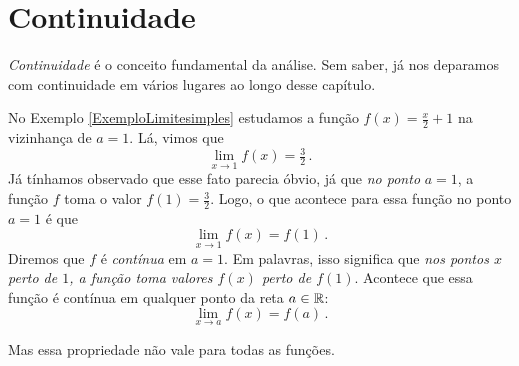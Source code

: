 

\chapter{Continuidade}\label{Cap:Continuidade}

\ifdefined\updateans
\fi


\emph{Continuidade} é o conceito fundamental da análise. Sem saber, já
nos  deparamos com continuidade
em vários lugares ao longo desse capítulo.

\begin{ex}
No Exemplo \ref{ExemploLimitesimples} estudamos a função $f(x)=\frac{x}{2}+1$
na vizinhança de $a=1$.
Lá, vimos que
\[ 
\lim_{x\to 1}f(x)=\tfrac32\,.
\]
Já tínhamos observado que esse fato parecia óbvio, já que \emph{no ponto}
$a=1$, a função $f$ toma o valor $f(1)=\frac32$. Logo, o que
acontece para essa função no ponto $a=1$ é que
\[ 
\lim_{x\to 1}f(x)=f(1)\,.
\]
Diremos que $f$ é \emph{contínua} em $a=1$.
Em palavras, isso significa que \emph{nos pontos $x$ perto de $1$, a função
toma valores $f(x)$ perto de $f(1)$}. 
Acontece que essa função é contínua em qualquer ponto da reta $a\in \mathbb{R}$:
\[ \lim_{x\to a}f(x)=f(a)\,.  \]
\end{ex}

Mas essa propriedade não vale para todas as funções. 

